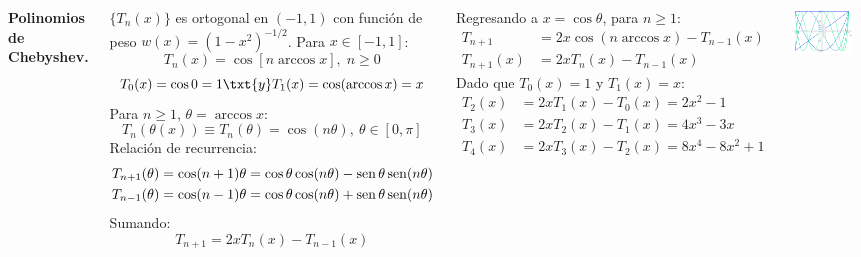 \documentclass[9pt, aspectratio=169]{beamer}
\begin{document}
\begin{frame}
\begin{columns}[t]
\cx
\textbf{Polinomios de Chebyshev.}

$\{ T_n(x)\}$ es ortogonal en $(-1, 1)$ con función de peso $w(x) = (1-x^2)^{-1/2}$. Para $x \in [-1, 1]$:
\[ T_n(x) = \cos[n \arccos x], \; n \geq 0 \] \pause \vspace{-2em}
\[ T_0(x) = \cos 0 = 1 \txt{y} T_1(x) =\cos(\arccos x) = x \] \pause
Para $n \geq 1$, $\theta = \arccos x$:
\[ T_n(\theta(x)) \equiv T_n(\theta) = \cos (n \theta), \: \theta \in [0, \pi] \]
Relación de recurrencia:
\begin{align*}
T_{n+1}(\theta) &= \cos(n+1) \theta = \cos \theta \cos(n \theta) - \operatorname{sen} \theta \operatorname{sen} (n \theta) \\
T_{n-1}(\theta) &= \cos(n-1) \theta =  \cos \theta \cos(n \theta) + \operatorname{sen} \theta \operatorname{sen} (n \theta) 
\end{align*}
Sumando: 
\[ T_{n+1} = 2x T_n(x) - T_{n-1}(x) \] \pause

\cx
Regresando a $x = \cos \theta$, para $n \geq 1$:
\begin{align*}
    T_{n+1} &= 2 x \cos(n \arccos x) - T_{n-1}(x) \\
    T_{n+1}(x) &= 2 x T_n(x) - T_{n-1}(x)
\end{align*} \pause
Dado que $T_0(x) = 1$ y $T_1(x) = x$:
\begin{align*}
T_2(x) &= 2 x T_1(x) - T_0(x) = 2 x^2 -1 \\
T_3(x) &= 2 x T_2(x) - T_1(x) = 4 x^3 - 3 x \\
T_4(x) &= 2 x T_3(x) - T_2(x) = 8 x^4 - 8 x^2 + 1
\end{align*}

\begin{center}
    \includegraphics[width=0.8\textwidth]{figs/fig-06.pdf}
\end{center}
\end{columns}
\end{frame}
\end{document}
